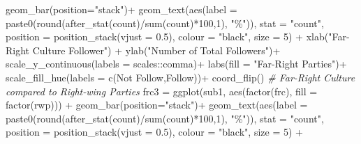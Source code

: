 \documentclass[
]{article}
\newenvironment{Shaded}{\begin{snugshade}}{\end{snugshade}}
\newcommand{\AttributeTok}[1]{\textcolor[rgb]{0.77,0.63,0.00}{#1}}
\newcommand{\CommentTok}[1]{\textcolor[rgb]{0.56,0.35,0.01}{\textit{#1}}}
\newcommand{\DecValTok}[1]{\textcolor[rgb]{0.00,0.00,0.81}{#1}}
\newcommand{\FloatTok}[1]{\textcolor[rgb]{0.00,0.00,0.81}{#1}}
\newcommand{\FunctionTok}[1]{\textcolor[rgb]{0.00,0.00,0.00}{#1}}
\newcommand{\NormalTok}[1]{#1}
\newcommand{\OtherTok}[1]{\textcolor[rgb]{0.56,0.35,0.01}{#1}}
\newcommand{\SpecialCharTok}[1]{\textcolor[rgb]{0.00,0.00,0.00}{#1}}
\newcommand{\StringTok}[1]{\textcolor[rgb]{0.31,0.60,0.02}{#1}}
\begin{document}
\begin{Shaded}
\begin{Highlighting}[]
  \FunctionTok{geom\_bar}\NormalTok{(}\AttributeTok{position=}\StringTok{"stack"}\NormalTok{)}\SpecialCharTok{+}
  \FunctionTok{geom\_text}\NormalTok{(}\FunctionTok{aes}\NormalTok{(}\AttributeTok{label =} \FunctionTok{paste0}\NormalTok{(}\FunctionTok{round}\NormalTok{(}\FunctionTok{after\_stat}\NormalTok{(count)}\SpecialCharTok{/}\FunctionTok{sum}\NormalTok{(count)}\SpecialCharTok{*}\DecValTok{100}\NormalTok{,}\DecValTok{1}\NormalTok{), }\StringTok{"\%"}\NormalTok{)), }\AttributeTok{stat =} \StringTok{"count"}\NormalTok{, }\AttributeTok{position =} \FunctionTok{position\_stack}\NormalTok{(}\AttributeTok{vjust =} \FloatTok{0.5}\NormalTok{), }\AttributeTok{colour =} \StringTok{"black"}\NormalTok{, }\AttributeTok{size =} \DecValTok{5}\NormalTok{) }\SpecialCharTok{+}
  \FunctionTok{xlab}\NormalTok{(}\StringTok{"Far{-}Right Culture Follower"}\NormalTok{) }\SpecialCharTok{+}
  \FunctionTok{ylab}\NormalTok{(}\StringTok{"Number of Total Followers"}\NormalTok{)}\SpecialCharTok{+}
  \FunctionTok{scale\_y\_continuous}\NormalTok{(}\AttributeTok{labels =}\NormalTok{ scales}\SpecialCharTok{::}\NormalTok{comma)}\SpecialCharTok{+}
  \FunctionTok{labs}\NormalTok{(}\AttributeTok{fill =} \StringTok{"Far{-}Right Parties"}\NormalTok{)}\SpecialCharTok{+}
  \FunctionTok{scale\_fill\_hue}\NormalTok{(}\AttributeTok{labels =} \FunctionTok{c}\NormalTok{(}\StringTok{\textquotesingle{}Not Follow\textquotesingle{}}\NormalTok{,}\StringTok{\textquotesingle{}Follow\textquotesingle{}}\NormalTok{))}\SpecialCharTok{+}
  \FunctionTok{coord\_flip}\NormalTok{()}
\CommentTok{\# Far{-}Right Culture compared to Right{-}wing Parties}
\NormalTok{frc3 }\OtherTok{=} \FunctionTok{ggplot}\NormalTok{(sub1, }\FunctionTok{aes}\NormalTok{(}\FunctionTok{factor}\NormalTok{(frc), }\AttributeTok{fill =} \FunctionTok{factor}\NormalTok{(rwp))) }\SpecialCharTok{+}
  \FunctionTok{geom\_bar}\NormalTok{(}\AttributeTok{position=}\StringTok{"stack"}\NormalTok{)}\SpecialCharTok{+}
  \FunctionTok{geom\_text}\NormalTok{(}\FunctionTok{aes}\NormalTok{(}\AttributeTok{label =} \FunctionTok{paste0}\NormalTok{(}\FunctionTok{round}\NormalTok{(}\FunctionTok{after\_stat}\NormalTok{(count)}\SpecialCharTok{/}\FunctionTok{sum}\NormalTok{(count)}\SpecialCharTok{*}\DecValTok{100}\NormalTok{,}\DecValTok{1}\NormalTok{), }\StringTok{"\%"}\NormalTok{)), }\AttributeTok{stat =} \StringTok{"count"}\NormalTok{, }\AttributeTok{position =} \FunctionTok{position\_stack}\NormalTok{(}\AttributeTok{vjust =} \FloatTok{0.5}\NormalTok{), }\AttributeTok{colour =} \StringTok{"black"}\NormalTok{, }\AttributeTok{size =} \DecValTok{5}\NormalTok{) }\SpecialCharTok{+}

\end{Highlighting}
\end{Shaded}
\end{document}
